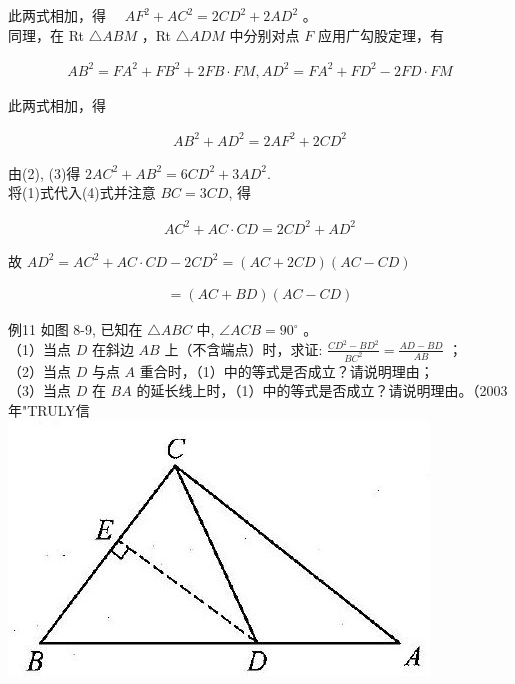 \documentclass[10pt]{article}
\begin{document}
此两式相加，得 $\quad A F^{2}+A C^{2}=2 C D^{2}+2 A D^{2}$ 。\\
同理，在 Rt $\triangle A B M$ ，Rt $\triangle A D M$ 中分别对点 $F$ 应用广勾股定理，有

\begin{align*}
A B^{2}=F A^{2}+F B^{2}+2 F B \cdot F M, A D^{2}=F A^{2}+F D^{2}-2 F D \cdot F M
\end{align*}

此两式相加，得

\begin{align*}
A B^{2}+A D^{2}=2 A F^{2}+2 C D^{2} \tag{3}
\end{align*}

由(2), (3)得 $2 A C^{2}+A B^{2}=6 C D^{2}+3 A D^{2}$.\\
将(1)式代入(4)式并注意 $B C=3 C D$, 得

\begin{align*}
A C^{2}+A C \cdot C D=2 C D^{2}+A D^{2}
\end{align*}

故 $A D^{2}=A C^{2}+A C \cdot C D-2 C D^{2}=(A C+2 C D)(A C-C D)$

\begin{align*}
=(A C+B D)(A C-C D)
\end{align*}

例11 如图 8-9, 已知在 $\triangle A B C$ 中, $\angle A C B=90^{\circ}$ 。\\
（1）当点 $D$ 在斜边 $A B$ 上（不含端点）时，求证: $\frac{C D^{2}-B D^{2}}{B C^{2}}=\frac{A D-B D}{A B}$ ；\\
（2）当点 $D$ 与点 $A$ 重合时，（1）中的等式是否成立？请说明理由；\\
（3）当点 $D$ 在 $B A$ 的延长线上时，（1）中的等式是否成立？请说明理由。（2003年"TRULY信\\
\includegraphics[max width=\textwidth, center]{2024_10_30_2c8f45efd4a519b08e1ag-086}
\end{document}
